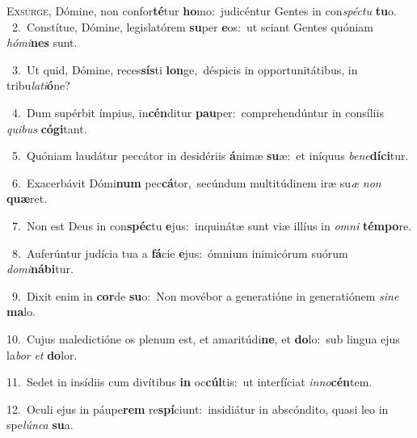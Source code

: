 \lettrine{\initial\textcolor{\initialcolor}{E}}{xsúrge,} Dómine, non confor\-\textbf{té}\-tur \textbf{ho}\-mo:~\star judicéntur Gentes in con\-\textit{spéc}\-\textit{tu} \textbf{tu}\-o.\\
{\numbfont\textcolor{\numbcolor}{~2.}}~Constítue, Dómine, legislatórem \textbf{su}\-per \textbf{e}\-os:~\star ut sciant Gentes quóniam \textit{hó}\-\textit{mi}\textbf{nes} sunt.\par
{\numbfont\textcolor{\numbcolor}{~3.}}~Ut quid, Dómine, reces\-\textbf{sís}\-ti \textbf{lon}\-ge,~\star déspicis in opportunitátibus, in tribu\-\textit{la}\-\textit{ti}\textbf{ó}ne?\par
{\numbfont\textcolor{\numbcolor}{~4.}}~Dum supérbit ímpius, in\-\textbf{cén}\-ditur \textbf{pau}\-per:~\star comprehendúntur in consíliis \textit{qui}\-\textit{bus} \textbf{có}\-\textbf{gi}tant.\par
{\numbfont\textcolor{\numbcolor}{~5.}}~Quóniam laudátur peccátor in desidériis \textbf{á}\-nimæ \textbf{su}\-æ:~\star et iníquus \textit{be}\-\textit{ne}\textbf{dí}\textbf{ci}tur.\par
{\numbfont\textcolor{\numbcolor}{~6.}}~Exacerbávit Dómi\textbf{num} pec\-\textbf{cá}\-tor,~\star secúndum multitúdinem iræ su\textit{æ} \textit{non} \textbf{quæ}\-ret.\par
{\numbfont\textcolor{\numbcolor}{~7.}}~Non est Deus in con\-\textbf{spéc}\-tu \textbf{e}\-jus:~\star inquinátæ sunt viæ illíus in \textit{om}\-\textit{ni} \textbf{tém}\-\textbf{po}re.\par
{\numbfont\textcolor{\numbcolor}{~8.}}~Auferúntur judícia tua a \textbf{fá}\-cie \textbf{e}\-jus:~\star ómnium inimicórum suórum \textit{do}\-\textit{mi}\textbf{ná}\textbf{bi}tur.\par
{\numbfont\textcolor{\numbcolor}{~9.}}~Dixit enim in \textbf{cor}\-de \textbf{su}\-o:~\star Non movébor a generatióne in generatiónem \textit{si}\-\textit{ne} \textbf{ma}\-lo.\par
{\numbfont\textcolor{\numbcolor}{10.}}~Cujus maledictióne os plenum est, et amaritúdi\-\textbf{ne}\-, et \textbf{do}\-lo:~\star sub lingua ejus la\textit{bor} \textit{et} \textbf{do}\-lor.\par
{\numbfont\textcolor{\numbcolor}{11.}}~Sedet in insídiis cum divítibus \textbf{in} oc\-\textbf{cúl}\-tis:~\star ut interfíciat \textit{in}\-\textit{no}\textbf{cén}tem.\par
{\numbfont\textcolor{\numbcolor}{12.}}~Oculi ejus in páupe\textbf{rem} re\-\textbf{spí}\-ciunt:~\star insidiátur in abscóndito, quasi leo in spe\-\textit{lún}\-\textit{ca} \textbf{su}\-a.\par
